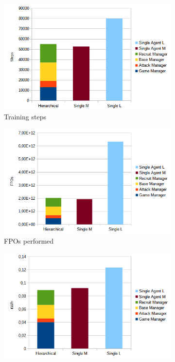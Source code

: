 \begin{figure}[t]
    \centering
    \begin{subfigure}[b]{0.48\textwidth}
        \includegraphics[width=1\textwidth]{figs/training_steps.png}
        \caption{Training steps}
    \end{subfigure}
    \hfill
    \begin{subfigure}[b]{0.48\textwidth}
        \includegraphics[width=1\textwidth]{figs/training_fpos.png}
        \caption{FPOs performed}
    \end{subfigure}
    \hfill
    \begin{subfigure}[b]{0.48\textwidth}
        \includegraphics[width=1\textwidth]{figs/training_energy.png}

\end{subfigure}
\end{figure}
